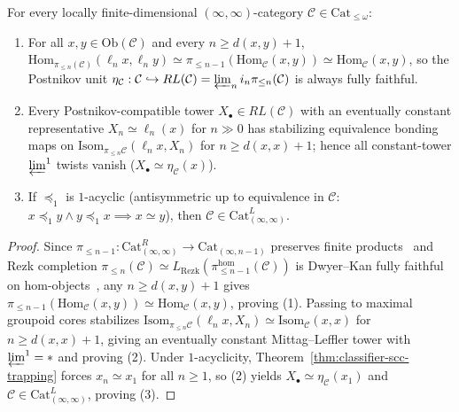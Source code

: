 \begin{theorem}\label{thm:ff-acyclic-completeness}%
%
%
For every locally finite-dimensional $(\infty, \infty)$-category $\mathcal{C} \in \mathrm{Cat}_{\le \omega}$:
\begin{enumerate}
  \item For all $x, y \in \mathrm{Ob}(\mathcal{C})$ and every $n \ge d(x, y) + 1$, $\mathrm{Hom}_{\pi_{\le n}(\mathcal{C})}(\ell_n x, \ell_n y) \simeq \pi_{\le n-1}(\mathrm{Hom}_{\mathcal{C}}(x, y)) \simeq \mathrm{Hom}_{\mathcal{C}}(x, y)$, so the Postnikov unit $\eta_{\mathcal{C}} : \mathcal{C} \hookrightarrow RL(\mathcal{C}) = \varprojlim_n i_n \pi_{\le n}(\mathcal{C})$ is always fully faithful.
  \item Every Postnikov-compatible tower $X_\bullet \in RL(\mathcal{C})$ with an eventually constant representative $X_n \simeq \ell_n(x)$ for $n \gg 0$ has stabilizing equivalence bonding maps on $\mathrm{Isom}_{\pi_{\le n}\mathcal{C}}(\ell_n x, X_n)$ for $n \ge d(x, x) + 1$; hence all constant-tower $\varprojlim^1$ twists vanish ($X_\bullet \simeq \eta_{\mathcal{C}}(x)$).
  \item If $\preceq_1$ is $1$-acyclic (antisymmetric up to equivalence in $\mathcal{C}$: $x \preceq_1 y \land y \preceq_1 x \implies x \simeq y$), then $\mathcal{C} \in \mathrm{Cat}^L_{(\infty, \infty)}$.
\end{enumerate}
\end{theorem}

\begin{proof}
Since $\pi_{\le n-1} : \mathrm{Cat}^R_{(\infty, \infty)} \to \mathrm{Cat}_{(\infty, n-1)}$ preserves finite products~\cite[Lemma~2.13 and Theorem~4.25]{ORW26} and Rezk completion $\pi_{\le n}(\mathcal{C}) \simeq L_{\mathrm{Rezk}}(\pi_{\le n-1}^{\mathrm{hom}}(\mathcal{C}))$ is Dwyer--Kan fully faithful on hom-objects~\cite[Theorem~5.6.2]{GepnerHaugseng15}, any $n \ge d(x, y) + 1$ gives $\pi_{\le n-1}(\mathrm{Hom}_{\mathcal{C}}(x, y)) \simeq \mathrm{Hom}_{\mathcal{C}}(x, y)$, proving (1). Passing to maximal groupoid cores stabilizes $\mathrm{Isom}_{\pi_{\le n}\mathcal{C}}(\ell_n x, X_n) \simeq \mathrm{Isom}_{\mathcal{C}}(x, x)$ for $n \ge d(x, x) + 1$, giving an eventually constant Mittag--Leffler tower with $\varprojlim^1 = *$ and proving (2). Under $1$-acyclicity, Theorem~\ref{thm:classifier-scc-trapping} forces $x_n \simeq x_1$ for all $n \ge 1$, so (2) yields $X_\bullet \simeq \eta_{\mathcal{C}}(x_1)$ and $\mathcal{C} \in \mathrm{Cat}^L_{(\infty, \infty)}$, proving (3).
\end{proof}

